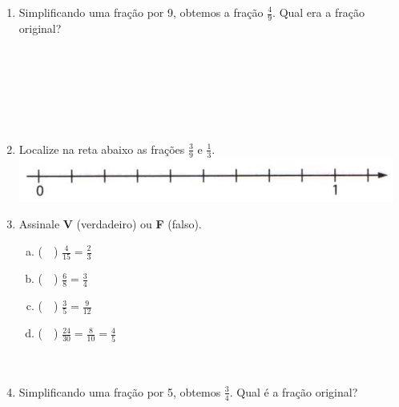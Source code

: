 \documentclass[a4paper,14pt]{article}
\begin{document}
\begin{multicols}{2}
\begin{enumerate}
			\item Simplificando uma fração por 9, obtemos a fração $\frac{4}{9}$. Qual era a fração original? \\\\\\\\\\\\\\
			\item Localize na reta abaixo as frações $\frac{3}{9}$ e $\frac{1}{3}$. \\
			\includegraphics[width=1\linewidth]{6FMA09_imagens/imagem3} \\
			\item Assinale \textbf{V} (verdadeiro) ou \textbf{F} (falso).
			\begin{enumerate}[a)] 
				\item (~~) $\frac{4}{15} = \frac{2}{3}$
				\item (~~) $\frac{6}{8} = \frac{3}{4}$
				\item (~~) $\frac{3}{5} = \frac{9}{12}$
				\item (~~) $\frac{24}{30} = \frac{8}{10} = \frac{4}{5}$ \\\\\\
			\end{enumerate}
			\item Simplificando uma fração por 5, obtemos $\frac{3}{4}$. Qual é a fração original?
		\end{enumerate}

\end{multicols}
\end{document}
